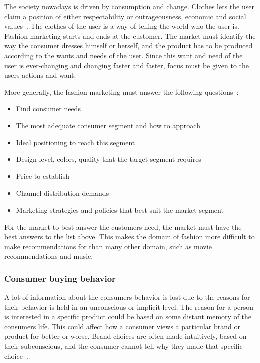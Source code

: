   The society nowadays is driven by consumption and change.
  Clothes lets the user claim a position of either respectability or outrageousness, economic and social values~\cite{barnard2002fashion}.
  The clothes of the user is a way of telling the world who the user is.
  Fashion marketing starts and ends at the customer.
  The market must identify the way the consumer dresses himself or herself, and the product has to be produced according to the wants and needs of the user.
  Since this want and need of the user is ever-changing and changing faster and faster, focus must be given to the users actions and want.

  More generally, the fashion marketing must answer the following questions~\cite{vignali2009fashion}:

  \begin{itemize}
    \item Find consumer needs
    \item The most adequate consumer segment and how to approach
    \item Ideal positioning to reach this segment
    \item Design level, colors, quality that the target segment requires
    \item Price to establish
    \item Channel distribution demands
    \item Marketing strategies and policies that best suit the market segment
  \end{itemize}

  For the market to best answer the customers need, the market must have the best answers to the list above.
  This makes the domain of fashion more difficult to make recommendations for than many other domain, such as movie recommendations and music.

\subsubsection{Consumer buying behavior}
  A lot of information about the consumers behavior is lost due to the reasons
  for their behavior is held in an unconscious or implicit level.  The reason for
  a person is interested in a specific product could be based on some distant
  memory of the consumers life.  This could affect how a consumer views a
  particular brand or product for better or worse.  Brand choices are often made
  intuitively, based on their subconscious, and the consumer cannot tell why
  they made that specific choice~\cite{vignali2009fashion}.

